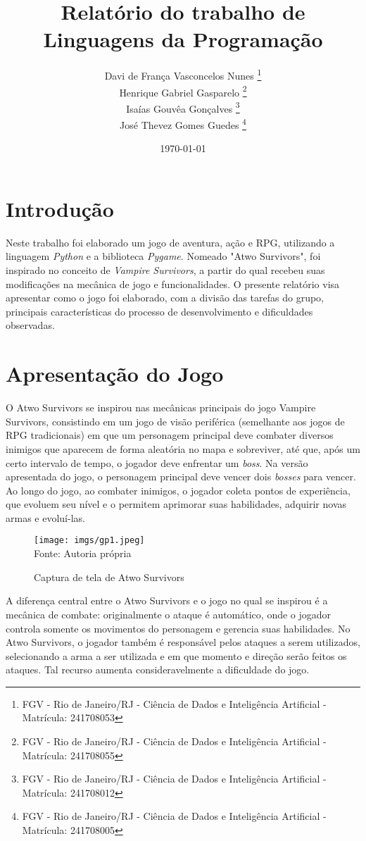 \documentclass[a4paper,12pt]{article}
\title{Relatório do trabalho de Linguagens da Programação}
\author{
        Davi de França Vasconcelos Nunes
        \footnote{FGV - Rio de Janeiro/RJ  - Ciência de Dados e Inteligência Artificial - Matrícula: 241708053} \\
        Henrique Gabriel Gasparelo 
        \footnote{FGV - Rio de Janeiro/RJ - Ciência de Dados e              Inteligência Artificial - Matrícula: 241708055} \\
        Isaías Gouvêa Gonçalves
        \footnote{FGV - Rio de Janeiro/RJ - Ciência de Dados e Inteligência Artificial - Matrícula: 241708012} \\
        José Thevez Gomes Guedes
        \footnote{FGV - Rio de Janeiro/RJ - Ciência de Dados e Inteligência Artificial - Matrícula: 241708005} \\
        }
\date{\today}
\begin{document}
\maketitle
\vspace{-1cm}

\tableofcontents

\newpage

\section{Introdução} 

Neste trabalho foi elaborado um jogo de aventura, ação e RPG, utilizando a linguagem \textit{Python} e a biblioteca \textit{Pygame}. Nomeado "Atwo Survivors", foi inspirado no conceito de \textit{Vampire Survivors}, a partir do qual recebeu suas modificações na mecânica de jogo e funcionalidades. O presente relatório visa apresentar como o jogo foi elaborado, com a divisão das tarefas do grupo, principais características do processo de desenvolvimento e dificuldades observadas.


\section{Apresentação do Jogo}

O Atwo Survivors se inspirou nas mecânicas principais do jogo Vampire Survivors, consistindo em um jogo de visão periférica (semelhante aos jogos de RPG tradicionais) em que um personagem principal deve combater diversos inimigos que aparecem de forma aleatória no mapa e sobreviver, até que, após um certo intervalo de tempo, o jogador deve enfrentar um \textit{boss}. Na versão apresentada do jogo, o personagem principal deve vencer dois \textit{bosses} para vencer. Ao longo do jogo, ao combater inimigos, o jogador coleta pontos de experiência, que evoluem seu nível e o permitem aprimorar suas habilidades, adquirir novas armas e evoluí-las.

\begin{figure}[h!]
    \centering
    \caption{Captura de tela de Atwo Survivors}
    \texttt{[image: imgs/gp1.jpeg]}\\
    {Fonte: Autoria própria}
\end{figure}

A diferença central entre o Atwo Survivors e o jogo no qual se inspirou é a mecânica de combate: originalmente o ataque é automático, onde o jogador controla somente os movimentos do personagem e gerencia suas habilidades. No Atwo Survivors, o jogador também é responsável pelos ataques a serem utilizados, selecionando a arma a ser utilizada e em que momento e direção serão feitos os ataques. Tal recurso aumenta consideravelmente a dificuldade do jogo.
\end{document}
